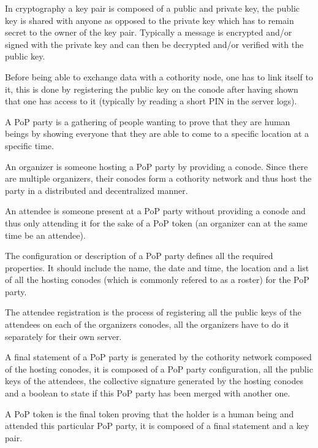 \begin{description}[style=nextline]
\item[Key Pair] In cryptography a key pair is composed of a public and private key, the public key is shared with anyone as opposed to the private key which has to remain secret to the owner of the key pair. Typically a message is encrypted and/or signed with the private key and can then be decrypted and/or verified with the public key.

\item[Conode Linking] Before being able to exchange data with a cothority node, one has to link itself to it, this is done by registering the public key on the conode after having shown that one has access to it (typically by reading a short PIN in the server logs).

\item[PoP Party] A PoP party is a gathering of people wanting to prove that they are human beings by showing everyone that they are able to come to a specific location at a specific time.

\item[Organizer (Org)] An organizer is someone hosting a PoP party by providing a conode. Since there are multiple organizers, their conodes form a cothority network and thus host the party in a distributed and decentralized manner.

\item[Attendee (Att)] An attendee is someone present at a PoP party without providing a conode and thus only attending it for the sake of a PoP token (an organizer can at the same time be an attendee).

\item[PoP Party Configuration/Description (Config/Desc)] The configuration or description of a PoP party defines all the required properties. It should include the name, the date and time, the location and a list of all the hosting conodes (which is commonly refered to as a roster) for the PoP party.

\item[Attendee Registration] The attendee registration is the process of registering all the public keys of the attendees on each of the organizers conodes, all the organizers have to do it separately for their own server.

\item[Final Statement] A final statement of a PoP party is generated by the cothority network composed of the hosting conodes, it is composed of a PoP party configuration, all the public keys of the attendees, the collective signature generated by the hosting conodes and a boolean to state if this PoP party has been merged with another one.

\item[PoP Token] A PoP token is the final token proving that the holder is a human being and attended this particular PoP party, it is composed of a final statement and a key pair.
\end{description}

